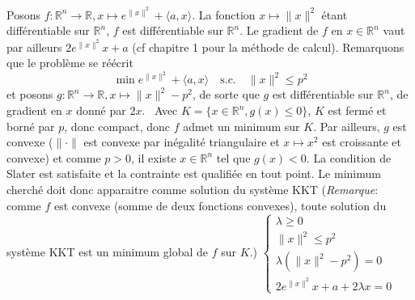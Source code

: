 \documentclass{report}
\begin{document}
\subsection{} \noindent{}\\ 
\\ 
\\
\noindent Posons $f:\mathbb R^n \to \mathbb R, x \mapsto e^{\|x\|^2}+\langle a,x\rangle$. La fonction $x\mapsto \|x\|^2$ étant différentiable sur $\mathbb R^n$, $f$ est différentiable sur $\mathbb R^n$. Le gradient de $f$ en $x\in \mathbb R^n$ vaut par ailleurs $2e^{\|x\|^2}x+a$ (cf chapitre 1 pour la méthode de calcul).\newline
Remarquons que le problème se réécrit $$\min e^{\|x\|^2}+\langle a,x\rangle \quad \text{s.c.} \quad \|x\|^2 \leq p^2$$ et posons $g:\mathbb R^n \to \mathbb R, x\mapsto \|x\|^2 - p^2$, de sorte que $g$ est différentiable sur $\mathbb R^n$, de gradient en $x$ donné par $2x$. \newline
\newline
Avec $K=\{x\in \mathbb R^n, g(x)\leq 0\}$, $K$ est fermé et borné par $p$, donc compact, donc $f$ admet un minimum sur $K$. \newline
Par ailleurs, $g$ est convexe ($\|\cdot\|$ est convexe par inégalité triangulaire et $x\mapsto x^2$ est croissante et convexe) et comme $p>0$, il existe $x\in \mathbb R^n$ tel que $g(x)<0$. La condition de Slater est satisfaite et la contrainte est qualifiée en tout point.\newline
\newline
Le minimum cherché doit donc apparaitre comme solution du système KKT (\textit{Remarque}: comme $f$ est convexe (somme de deux fonctions convexes), toute solution du système KKT est un minimum global de $f$ sur $K$.) \newline
$\begin{cases}
\lambda\geq 0 \\
\|x\|^2\leq p^2 \\
\lambda(\|x\|^2-p^2)=0 \\
2e^{\|x\|^2}x+a+2\lambda x =0
\end{cases}$\newline
\end{document}

